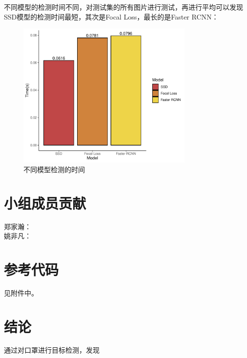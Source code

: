 \documentclass[journal,transmag]{IEEEtran}
\begin{document}
不同模型的检测时间不同，对测试集的所有图片进行测试，再进行平均可以发现SSD模型的检测时间最短，其次是Focal Loss，最长的是Faster RCNN：
\begin{figure}[h]
\centering
\includegraphics[width=3.44in]{time.pdf}
\caption{不同模型检测的时间}
\end{figure}

\section{小组成员贡献}
郑家瀚：\\
姚非凡：
\section{参考代码}
见附件中。
\section{结论}
通过对口罩进行目标检测，发现


%
%
\end{document}
